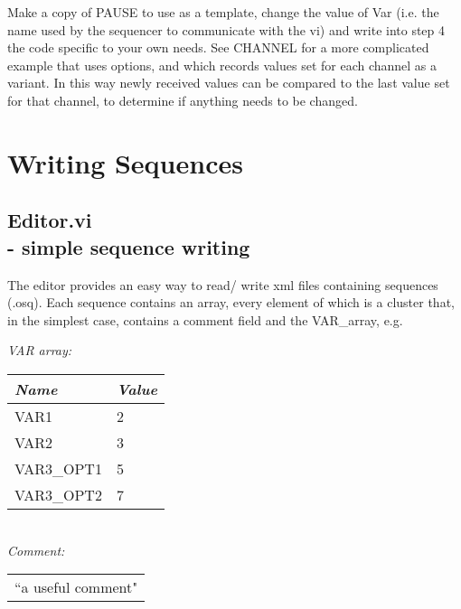 \documentclass[10pt,a4paper]{article}
\begin{document}
Make a copy of PAUSE to use as a template, change the value of Var (i.e. the name used by the sequencer to communicate with the vi) and write into step 4 the code specific to your own needs.  See CHANNEL for a more complicated example that uses options, and which records values set for each channel as a variant.  In this way newly received values can be compared to the last value set for that channel, to determine if anything needs to be changed.

\section{Writing Sequences}

\subsection[Editor.vi ]{Editor.vi \\ %
	\normalsize - simple sequence writing}
The editor provides an easy way to read/ write xml files containing sequences (.osq).  Each sequence contains an array, every element of which is a cluster that, in the simplest case, contains a comment field and the VAR\_array, e.g.

\hangindent=0.7cm
\emph{VAR array:} \\
\begin{tabularx}{0.4\textwidth}{X|X}
	\emph{Name} & \emph{Value} \\
	\hline
	VAR1 & 2 \\
	VAR2 & 3 \\
	VAR3\_OPT1 & 5 \\
	VAR3\_OPT2 & 7
\end{tabularx}
\vspace{3mm} \\
\emph{Comment:} \\
\begin{tabularx}{0.85\textwidth}{l}
	``a useful comment"
\end{tabularx}
\vspace{3mm}
\end{document}
